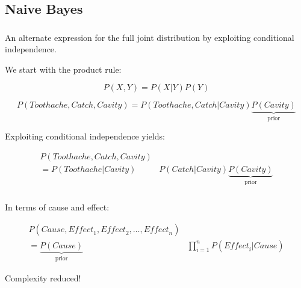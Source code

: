 \subsection{Naive Bayes}

\begin{frame}\frametitle{\subsecname}

An alternate expression for the full joint distribution by exploiting conditional independence.

We start with the product rule:

\begin{equation}
P(X,Y) = P(X|Y)P(Y)    
\end{equation}

\begin{equation}
P(\mathit{Toothache},\mathit{Catch},\mathit{Cavity}) = P(\mathit{Toothache},\mathit{Catch}|\mathit{Cavity}) \underbrace{P(\mathit{Cavity})}_{\text{prior}} 
\end{equation}

Exploiting conditional independence yields:

\begin{align}
P(\mathit{Toothache},\mathit{Catch},\mathit{Cavity}) &\\
= P(\mathit{Toothache}|\mathit{Cavity}) &P(\mathit{Catch}|\mathit{Cavity}) \underbrace{P(\mathit{Cavity})}_{\text{prior}} 
\end{align}

\end{frame}

\begin{frame}\frametitle{\subsecname}


In terms of cause and effect:

\begin{align}
P(\mathit{Cause}, \mathit{Effect}_1, \mathit{Effect}_2,\ldots, \mathit{Effect}_n) &\\
= \underbrace{P(\mathit{Cause})}_{\text{prior}} &\prod_{i=1}^{n} P(\mathit{Effect}_{i}|\mathit{Cause})
\end{align}

Complexity reduced!

\end{frame}
